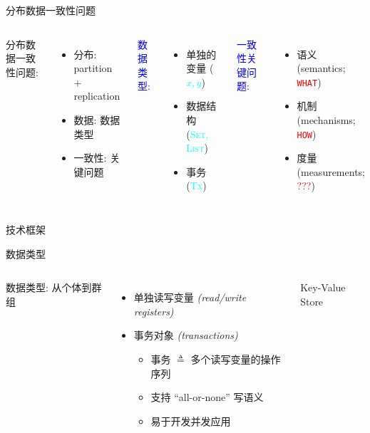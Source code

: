 \begin{frame}{分布数据一致性问题}
  \begin{columns}
	  分布数据一致性问题:
	  \begin{itemize}
		\item [\textcolor{blue}{\bf \cmark}] 分布: partition + replication
		\item [\textcolor{red}{\bf \xmark}] 数据: 数据类型
		\item [\textcolor{red}{\bf \xmark}] 一致性: 关键问题
	  \end{itemize}
	\pause
	  \textcolor{blue}{数据类型:}
	  \begin{itemize}
		\item 单独的变量 (\textcolor{cyan}{$x,y$})
		\item 数据结构 (\textcolor{cyan}{\textsc{Set, List}})
		\item 事务 (\textcolor{cyan}{\textsc{Tx}})
	  \end{itemize}

	  \pause
	  \vspace{0.80cm}

	  \textcolor{blue}{一致性关键问题:}
	  \begin{itemize}
		\item 语义 (semantics; \textcolor{red}{\texttt{WHAT}})
		\item 机制 (mechanisms; \textcolor{red}{\texttt{HOW}})
		\item 度量 (measurements; \textcolor{red}{???})
	  \end{itemize}
  \end{columns}
\end{frame}
\begin{frame}{技术框架}
\end{frame}
\begin{frame}{数据类型}
  \begin{columns}
	  数据类型: 从个体到群组
	  \begin{itemize}
		\setlength{\itemsep}{8pt}
		\item<1-> 单独读写变量 \textit{(read/write registers)}
		\item<2-> 事务对象 \textit{(transactions)}
		  \begin{itemize}
			\setlength{\itemsep}{4pt}
			\item 事务 $\triangleq$ 多个读写变量的操作序列
			\item 支持 ``all-or-none'' 写语义
			\item 易于开发并发应用
		  \end{itemize}
	  \end{itemize}
	   {
	    \begin{center}
		  Key-Value Store
	    \end{center}
	  }
  \end{columns}
\end{frame}
